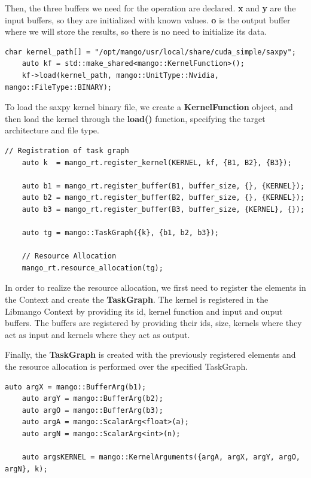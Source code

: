 Then, the three buffers we need for the operation are declared. \textbf{x} and \textbf{y} are the input buffers, so they are initialized with known values. \textbf{o} is the output buffer where we will store the results, so there is no need to initialize its data.

\begin{lstlisting}[style=CStyle, caption=Sample - Kernel loading]
    char kernel_path[] = "/opt/mango/usr/local/share/cuda_simple/saxpy";
    auto kf = std::make_shared<mango::KernelFunction>();
    kf->load(kernel_path, mango::UnitType::Nvidia, mango::FileType::BINARY);
\end{lstlisting}

To load the saxpy kernel binary file, we create a \textbf{KernelFunction} object, and then load the kernel through the \textbf{load()} function, specifying the target architecture and file type.

\begin{lstlisting}[style=CStyle, caption=Sample - TaskGraph registration and resource allocation]
    // Registration of task graph
    auto k  = mango_rt.register_kernel(KERNEL, kf, {B1, B2}, {B3});

    auto b1 = mango_rt.register_buffer(B1, buffer_size, {}, {KERNEL});
    auto b2 = mango_rt.register_buffer(B2, buffer_size, {}, {KERNEL});
    auto b3 = mango_rt.register_buffer(B3, buffer_size, {KERNEL}, {});

    auto tg = mango::TaskGraph({k}, {b1, b2, b3});

    // Resource Allocation
    mango_rt.resource_allocation(tg);
\end{lstlisting}

In order to realize the resource allocation, we first need to register the elements in the Context and create the \textbf{TaskGraph}.
The kernel is registered in the Libmango Context by providing its id, kernel function and input and ouput buffers.
The buffers are registered by providing their ids, size, kernels where they act as input and kernels where they act as output.

Finally, the \textbf{TaskGraph} is created with the previously registered elements and the resource allocation is performed over the specified TaskGraph.

\begin{lstlisting}[style=CStyle, caption=Sample - Arguments set up]
    auto argX = mango::BufferArg(b1);
    auto argY = mango::BufferArg(b2);
    auto argO = mango::BufferArg(b3);
    auto argA = mango::ScalarArg<float>(a);
    auto argN = mango::ScalarArg<int>(n);

    auto argsKERNEL = mango::KernelArguments({argA, argX, argY, argO, argN}, k);
\end{lstlisting}

